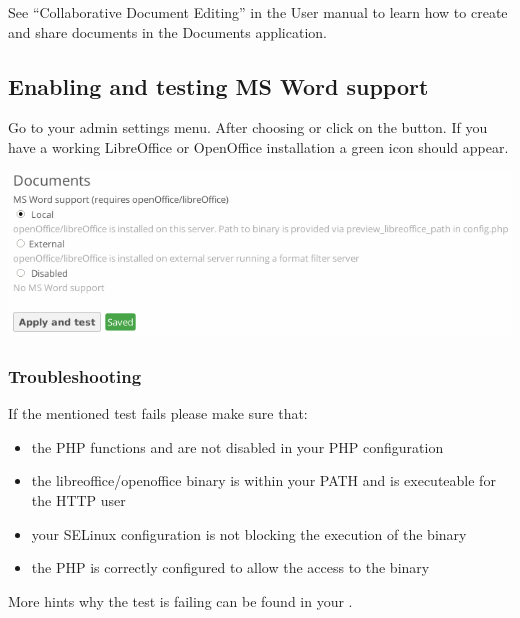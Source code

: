 \documentclass[letterpaper,10pt,english]{sphinxmanual}
\begin{document}
See ``Collaborative Document Editing'' in the User manual to learn how to create
and share documents in the Documents application.


\subsection{Enabling and testing MS Word support}
\label{configuration_files/collaborative_documents_configuration:enabling-and-testing-ms-word-support}
Go to your admin settings menu. After choosing  or  click
on the  button. If you have a working LibreOffice or OpenOffice
installation a green  icon should appear.

\includegraphics{documents_apply_test.png}


\subsubsection{Troubleshooting}
\label{configuration_files/collaborative_documents_configuration:troubleshooting}
If the mentioned test fails please make sure that:
\begin{itemize}
\item {} 
the PHP functions  and  are not disabled in your
PHP configuration

\item {} 
the libreoffice/openoffice binary is within your PATH and is executeable for the
HTTP user

\item {} 
your SELinux configuration is not blocking the execution of the binary

\item {} 
the PHP  is correctly configured to allow the access to the binary

\end{itemize}

More hints why the test is failing can be found in your .
\end{document}
